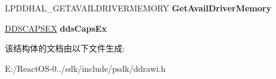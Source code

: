 \begin{DoxyCompactItemize}
\mbox{\label{struct___d_d_h_a_l___g_e_t_a_v_a_i_l_d_r_i_v_e_r_m_e_m_o_r_y_d_a_t_a_ac52c8be44e426674ce581e3279acb42d}} 
L\+P\+D\+D\+H\+A\+L\+\_\+\+G\+E\+T\+A\+V\+A\+I\+L\+D\+R\+I\+V\+E\+R\+M\+E\+M\+O\+RY {\bfseries Get\+Avail\+Driver\+Memory}
\item 
\mbox{\label{struct___d_d_h_a_l___g_e_t_a_v_a_i_l_d_r_i_v_e_r_m_e_m_o_r_y_d_a_t_a_a6c3b8bd0f067e4e3244f7a2ba159109c}} 
\hyperlink{struct___d_d_s_c_a_p_s_e_x}{D\+D\+S\+C\+A\+P\+S\+EX} {\bfseries dds\+Caps\+Ex}
\end{DoxyCompactItemize}


该结构体的文档由以下文件生成\+:\begin{DoxyCompactItemize}
\item 
E\+:/\+React\+O\+S-\/0../sdk/include/psdk/ddrawi.\+h\end{DoxyCompactItemize}
